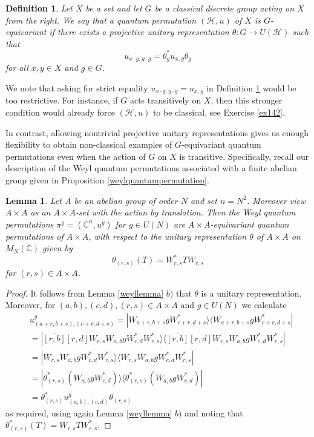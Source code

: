 \documentclass[a4paper]{amsart}
\newcommand*{\Hc}{\mathcal{H}}
\newcommand*{\ket}{\rangle}
\newcommand*{\bra}{\langle}
\numberwithin{equation}{section}
\theoremstyle{change}
\newtheorem{lemma}[theorem]{Lemma}
\newtheorem{definition}[theorem]{Definition}
\begin{document}
\begin{definition} \label{gequiv}
Let $ X $ be a set and let $ G $ be a classical discrete group acting on $ X $ from the right. We say that a quantum permutation $ (\Hc,u) $ of $ X $ is $ G $-equivariant 
if there exists a projective unitary representation $ \theta: G \rightarrow U(\Hc) $ such that 
$$
u_{x \cdot g, y \cdot g} = \theta_g^* u_{x, y} \theta_g 
$$
for all $ x, y \in X $ and $ g \in G $. 
\end{definition}  

We note that asking for strict equality $ u_{x \cdot g, y \cdot g} = u_{x,y} $ in Definition \ref{gequiv} would be too restrictive. For instance, if $ G $ acts transitively on $ X $, then this stronger condition would already force $ (\Hc, u) $ to be classical, see Exercise \ref{ex142}.

In contrast, allowing nontrivial projective unitary representations gives us enough flexibility to obtain non-classical examples of $ G $-equivariant quantum permutations even when the action of $ G $ on $ X $ is transitive. 
Specifically, recall our description of the Weyl quantum permutations associated with a finite abelian group given in Proposition \ref{weylquantumpermutation}. 

\begin{lemma} \label{weylequivariant}
Let $ A $ be an abelian group of order $ N $ and set $ n = N^2 $. Moreover view $ A \times A $ as an $ A \times A $-set with the action by translation. Then the Weyl quantum permutations $ \pi^g = (\mathbb{C}^n, u^g) $ for $ g \in U(N) $ are $ A \times A $-equivariant quantum permutations of $ A \times A $,  with respect to the unitary representation $ \theta $ of $ A \times A $ on $ M_N(\mathbb{C}) $ given by 
$$
\theta_{(r,s)}(T) = W_{r,s}^* T W_{r,s} 
$$
for $ (r,s) \in A \times A $. 
\end{lemma} 

\begin{proof} 
It follows from Lemma \ref{weyllemma} $ b) $ that $ \theta $ is a unitary representation. 
Moreover, for $ (a,b),(c,d),(r,s) \in A \times A $ and $ g \in U(N) $ we calculate 
\begin{align*}
&u^g_{(a+r,b+s),(c+r,d+s)} = |W_{a+r,b+s} g W_{c+r,d+s}^* \ket \bra W_{a+r,b+s} g W_{c+r,d+s}^*| \\
&= |\overline{[r,b]} [r, d] W_{r,s} W_{a,b} g W_{c,d}^* W_{r,s}^* \ket \bra \overline{[r,b]} [r, d] W_{r,s} W_{a,b} g W_{c,d}^* W_{r,s}^*| \\
&= |W_{r,s} W_{a,b} g W_{c,d}^* W_{r,s}^* \ket \bra W_{r,s} W_{a,b} g W_{c,d}^* W_{r,s}^*| \\
&= |\theta_{(r,s)}^* (W_{a,b} g W_{c,d}^*)\ket \bra \theta_{(r,s)}^*(W_{a,b} g W_{c,d}^*)| \\
&= \theta_{(r,s)}^* u^g_{(a,b),(c,d)} \theta_{(r,s)}
\end{align*} 
as required, using again Lemma \ref{weyllemma} $ b) $ and noting that $ \theta_{(r,s)}^*(T) = W_{r,s} T W_{r,s}^* $. 
\end{proof} 
\end{document}
